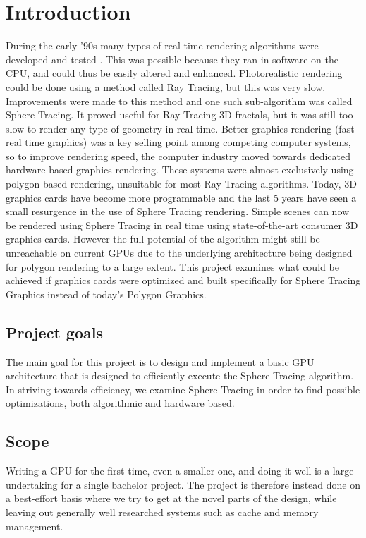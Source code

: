 \chapter{Introduction} 	
	During the early '90s many types of real time rendering algorithms were 
	developed and tested \cite{TODO}. This was possible because they ran in 
	software on the CPU, and could thus be easily altered and enhanced. 
	Photorealistic rendering could be done using a method called Ray Tracing, 
	but this was very slow\cite{TODO}. Improvements were made to this method and 
	one such sub-algorithm was called Sphere Tracing. It proved useful for Ray 
	Tracing 3D fractals\cite{TODO}, but it was still too slow to render any type 
	of geometry in real time\cite{TODO}. Better graphics rendering (fast real 
	time graphics) was a key selling point among competing computer systems, so 
	to improve rendering speed, the computer industry moved towards dedicated 
	hardware based 	graphics rendering\cite{TODO}. These systems were almost 
	exclusively using polygon-based rendering, unsuitable for most Ray Tracing 
	algorithms. Today, 	3D graphics cards have become more programmable and the 
	last 5 years have seen a small resurgence in the use of Sphere Tracing 
	rendering\cite{TODO}. Simple scenes can now be rendered using Sphere Tracing 
	in real time using state-of-the-art consumer 3D graphics cards. However the 
	full potential of the algorithm might still be unreachable on current GPUs 
	due to the underlying architecture being designed for polygon rendering to a 
	large extent\cite{TODO}. This project examines what could be achieved if 
	graphics cards were optimized and built specifically for Sphere Tracing 
	Graphics instead of today’s Polygon Graphics.		 
	
	\section{Project goals}
	
		The main goal for this project is to design and implement a basic GPU 
		architecture that is designed to efficiently execute the Sphere Tracing 
		algorithm. In striving towards efficiency, we examine Sphere Tracing in 
		order to find possible optimizations, both algorithmic and hardware 
		based.
		
	\section{Scope}

		Writing a GPU for the first time, even a smaller one, and doing it well is a large undertaking for a single bachelor project. The project is therefore instead done on a best-effort basis where we try to get at the novel parts of the design, while leaving out generally well researched systems such as cache and memory management. 
